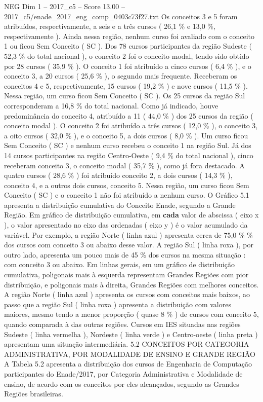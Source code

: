 \begin{textsample}{NEG Dim 1 – 2017\_c5 – Score 13.00 – 2017\_c5/enade\_2017\_eng\_comp\_0403c73f27.txt}
Os conceitos 3 e 5 foram atribuídos, respectivamente, a seis e a três cursos ( 26,1 \% e 13,0 \%, respectivamente ).
Ainda nessa região, nenhum curso foi avaliado com o conceito 1 ou ficou Sem Conceito ( SC ).
Dos 78 cursos participantes da região Sudeste ( 52,3 \% do total nacional ), o conceito 2 foi o conceito modal, tendo sido obtido por 28 cursos ( 35,9 \% ).
O conceito 1 foi atribuído a cinco cursos ( 6,4 \% ), e o conceito 3, a 20 cursos ( 25,6 \% ), o segundo mais frequente.
Receberam os conceitos 4 e 5, respectivamente, 15 cursos ( 19,2 \% ) e nove cursos ( 11,5 \% ).
Nessa região, um curso ficou Sem Conceito ( SC ).
Os 25 cursos da região Sul corresponderam a 16,8 \% do total nacional.
Como já indicado, houve predominância do conceito 4, atribuído a 11 ( 44,0 \% ) dos 25 cursos da região ( conceito modal ).
O conceito 2 foi atribuído a três cursos ( 12,0 \% ), o conceito 3, a oito cursos ( 32,0 \% ), e o conceito 5, a dois cursos ( 8,0 \% ).
Um curso ficou Sem Conceito ( SC ) e nenhum curso recebeu o conceito 1 na região Sul.
Já dos 14 cursos participantes na região Centro-Oeste ( 9,4 \% do total nacional ), cinco receberam conceito 3, o conceito modal ( 35,7 \% ), como já fora destacado.
A quatro cursos ( 28,6 \% ) foi atribuído conceito 2, a dois cursos ( 14,3 \% ), conceito 4, e a outros dois cursos, conceito 5.
Nessa região, um curso ficou Sem Conceito ( SC ) e o conceito 1 não foi atribuído a nenhum curso.
O Gráfico 5.1 apresenta a distribuição cumulativa do Conceito Enade, segundo a Grande Região.
Em gráfico de distribuição cumulativa, em \textbf{cada} valor de abscissa ( eixo x ), o valor apresentado no eixo das ordenadas ( eixo y ) é o valor acumulado da variável.
Por exemplo, a região Norte ( linha azul ) apresenta cerca de 75,0 \% \% dos cursos com conceito 3 ou abaixo desse valor.
A região Sul ( linha roxa ), por outro lado, apresenta um pouco mais de 45 \% dos cursos na mesma situação : com conceito 3 ou abaixo.
Em linhas gerais, em um gráfico de distribuição cumulativa, poligonais mais à esquerda representam Grandes Regiões com pior distribuição, e poligonais mais à direita, Grandes Regiões com melhores conceitos.
A região Norte ( linha azul ) apresenta os cursos com conceitos mais baixos, ao passo que a região Sul ( linha roxa ) apresenta a distribuição com valores maiores, mesmo tendo a menor proporção ( quase 8 \% ) de cursos com conceito 5, quando comparada à das outras regiões.
Cursos em IES situadas nas regiões Sudeste ( linha vermelha ), Nordeste ( linha verde ) e Centro-oeste ( linha preta ) apresentam uma situação intermediária. 5.2 CONCEITOS POR CATEGORIA ADMINISTRATIVA, POR MODALIDADE DE ENSINO E GRANDE REGIÃO A Tabela 5.2 apresenta a distribuição dos cursos de Engenharia de Computação participantes do Enade/2017, por Categoria Administrativa e Modalidade de ensino, de acordo com os conceitos por eles alcançados, segundo as Grandes Regiões brasileiras.

\end{textsample}
